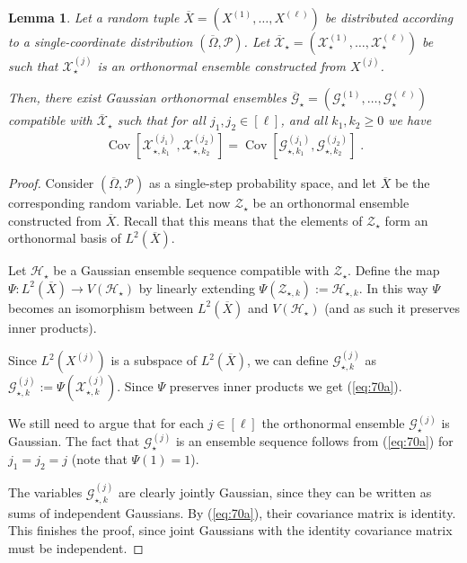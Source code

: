 \documentclass{daj}
\newcommand{\1}{\mathbbm{1}}
\theoremstyle{plain}
\newtheorem{lemma}[theorem]{Lemma}
\theoremstyle{definition}
\DeclareMathOperator*{\Cov}{Cov}
\begin{document}
\begin{lemma}\label{lem:cov-xg}
Let a random tuple $\overline{X} = 
(X^{(1)},\ldots,X^{(\ell)})$ be distributed according
to a single-coordinate distribution 
$(\overline{\Omega}, \mathcal{P})$.
Let $\overline{\mathcal{X}}_\star = 
(\mathcal{X}_\star^{(1)},\ldots,\mathcal{X}_\star^{(\ell)})$ be such
that $\mathcal{X}_\star^{(j)}$ is an orthonormal ensemble constructed 
from $X^{(j)}$.

Then, there exist Gaussian orthonormal ensembles
$\overline{\mathcal{G}}_\star = 
(\mathcal{G}_\star^{(1)},\ldots,\mathcal{G}_\star^{(\ell)})$ 
compatible with $\overline{\mathcal{X}}_\star$ such
that for all $j_1,j_2 \in [\ell]$, and all $k_1,k_2 \geq 0$ we have
\begin{align}\label{eq:70a}
  \Cov\left[ \mathcal{X}_{\star, k_1}^{(j_1)}, \mathcal{X}_{\star, k_2}^{(j_2)} 
  \right]
  = \Cov\left[ 
  \mathcal{G}_{\star, k_1}^{(j_1)}, \mathcal{G}_{\star, k_2}^{(j_2)} \right] \; .
\end{align}
\end{lemma}
\begin{proof}
Consider
$(\overline{\Omega}, \mathcal{P})$ 
as a single-step probability space, and let $\overline{X}$ 
be the corresponding random variable.
Let now $\mathcal{Z}_\star$ be an orthonormal ensemble constructed
from $\overline{X}$. Recall that this means that
the elements of $\mathcal{Z}_\star$ form an orthonormal basis
of $L^2(\overline{X})$.

Let $\mathcal{H}_\star$ be a Gaussian ensemble sequence compatible
with $\mathcal{Z}_\star$.
Define the map
$\Psi: L^2(\overline{X}) \to V(\mathcal{H}_\star)$ by linearly extending
$\Psi(\mathcal{Z}_{\star,k}) := \mathcal{H}_{\star,k}$.
In this way $\Psi$ becomes an isomorphism between $L^2(\overline{X})$
and $V(\mathcal{H}_\star)$ (and as such it preserves inner products).

Since $L^2(X^{(j)})$ is a subspace of $L^2(\overline{X})$, we can define
$\mathcal{G}_{\star,k}^{(j)}$ as $\mathcal{G}_{\star,k}^{(j)} := 
\Psi(\mathcal{X}_{\star,k}^{(j)})$.
Since $\Psi$ preserves inner products we get (\ref{eq:70a}).

We still need to argue that for each $j \in [\ell]$ the
orthonormal ensemble $\mathcal{G}_\star^{(j)}$ is Gaussian.
The fact that $\mathcal{G}_\star^{(j)}$ is an ensemble sequence
follows from (\ref{eq:70a}) for $j_1 = j_2 = j$ (note that $\Psi(1) = 1$).

The variables $\mathcal{G}_{\star,k}^{(j)}$ are clearly jointly Gaussian, 
since they can be written as sums of independent Gaussians.
By (\ref{eq:70a}), their covariance matrix is identity.
This finishes the proof, since joint Gaussians with 
the identity covariance matrix must be independent.
\end{proof}
\end{document}
